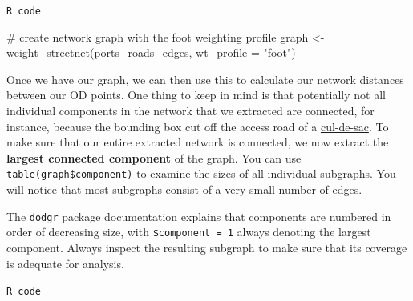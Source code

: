 \documentclass[
  letterpaper,
  DIV=11,
  numbers=noendperiod]{scrreprt}
\newenvironment{Shaded}{\begin{snugshade}}{\end{snugshade}}
\newcommand{\AttributeTok}[1]{\textcolor[rgb]{0.40,0.45,0.13}{#1}}
\newcommand{\CommentTok}[1]{\textcolor[rgb]{0.37,0.37,0.37}{#1}}
\newcommand{\DecValTok}[1]{\textcolor[rgb]{0.68,0.00,0.00}{#1}}
\newcommand{\FunctionTok}[1]{\textcolor[rgb]{0.28,0.35,0.67}{#1}}
\newcommand{\NormalTok}[1]{\textcolor[rgb]{0.00,0.23,0.31}{#1}}
\newcommand{\OtherTok}[1]{\textcolor[rgb]{0.00,0.23,0.31}{#1}}
\newcommand{\SpecialCharTok}[1]{\textcolor[rgb]{0.37,0.37,0.37}{#1}}
\newcommand{\StringTok}[1]{\textcolor[rgb]{0.13,0.47,0.30}{#1}}
\begin{document}
\begin{codelisting}

\caption{\texttt{R code}}

\begin{Shaded}
\begin{Highlighting}[]
\CommentTok{\# create network graph with the foot weighting profile}
\NormalTok{graph }\OtherTok{\textless{}{-}} \FunctionTok{weight\_streetnet}\NormalTok{(ports\_roads\_edges, }\AttributeTok{wt\_profile =} \StringTok{"foot"}\NormalTok{)}
\end{Highlighting}
\end{Shaded}

\end{codelisting}

Once we have our graph, we can then use this to calculate our network
distances between our OD points. One thing to keep in mind is that
potentially not all individual components in the network that we
extracted are connected, for instance, because the bounding box cut off
the access road of a
\href{https://en.wikipedia.org/wiki/Dead_end_(street)}{cul-de-sac}. To
make sure that our entire extracted network is connected, we now extract
the \textbf{largest connected component} of the graph. You can use
\texttt{table(graph\$component)} to examine the sizes of all individual
subgraphs. You will notice that most subgraphs consist of a very small
number of edges.

\begin{tcolorbox}[enhanced jigsaw, rightrule=.15mm, colback=white, opacityback=0, opacitybacktitle=0.6, coltitle=black, colbacktitle=quarto-callout-note-color!10!white, breakable, arc=.35mm, title=\textcolor{quarto-callout-note-color}{\faInfo}\hspace{0.5em}{Note}, left=2mm, leftrule=.75mm, bottomtitle=1mm, toprule=.15mm, bottomrule=.15mm, colframe=quarto-callout-note-color-frame, toptitle=1mm, titlerule=0mm]

The \texttt{dodgr} package documentation explains that components are
numbered in order of decreasing size, with \texttt{\$component\ =\ 1}
always denoting the largest component. Always inspect the resulting
subgraph to make sure that its coverage is adequate for analysis.

\end{tcolorbox}

\begin{codelisting}

\caption{\texttt{R code}}

\begin{Shaded}
\end{Shaded}

\end{codelisting}
\end{document}
